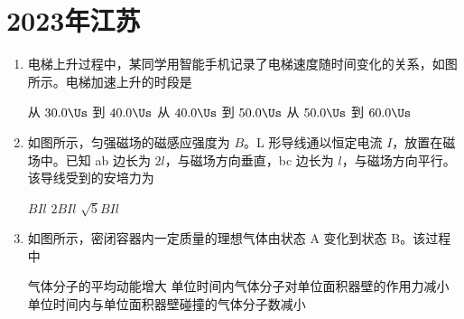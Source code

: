 \documentclass[\gkver]{gaokaozhenti}
\begin{document}
\chapter{2023年江苏}

\begin{enumerate}
\item
电梯上升过程中，某同学用智能手机记录了电梯速度随时间变化的关系，如图所示。电梯加速上升的时段是


{从 $30.0\Us$ 到 $40.0\Us$}
{从 $40.0\Us$ 到 $50.0\Us$}
{从 $50.0\Us$ 到 $60.0\Us$}


\item
如图所示，匀强磁场的磁感应强度为 $B$。L 形导线通以恒定电流 $I$，放置在磁场中。已知 ab 边长为 $2l$，与磁场方向垂直，bc 边长为 $l$，与磁场方向平行。该导线受到的安培力为


{$BIl$}
{$2BIl$}
{$\sqrt{5}BIl$}


\item
如图所示，密闭容器内一定质量的理想气体由状态 A 变化到状态 B。该过程中


{气体分子的平均动能增大}
{单位时间内气体分子对单位面积器壁的作用力减小}
{单位时间内与单位面积器壁碰撞的气体分子数减小}


\end{enumerate}
\end{document}
